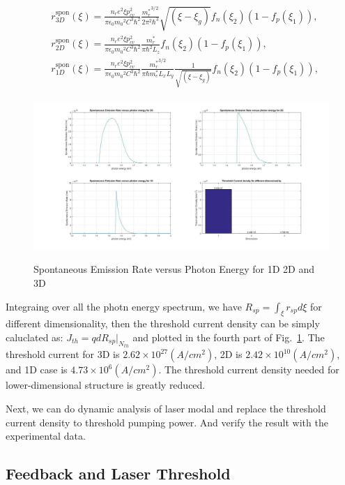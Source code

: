 \begin{eqnarray}
\begin{aligned}
& r_{3D}^{\mathrm{spon}}(\xi)=\frac{n_re^2\xi{p_{cv}^2}}{{\pi}\epsilon_0{m_0}^2C^3{\hbar^2}}\frac{{m_r^\ast}^{3/2}}{2\pi^2\hbar^3}{\sqrt{(\xi-\xi_g)}}f_n(\xi_2)(1-f_p(\xi_1)),
\\
& r_{2D}^{\mathrm{spon}}(\xi)=\frac{n_re^2\xi{p_{cv}^2}}{{\pi}\epsilon_0{m_0}^2C^3{\hbar^2}}\frac{{m_r^\ast}}{\pi\hbar^2L_z}f_n(\xi_2)(1-f_p(\xi_1)),
\\
& r_{1D}^{\mathrm{spon}}(\xi)=\frac{n_re^2\xi{p_{cv}^2}}{{\pi}\epsilon_0{m_0}^2C^3{\hbar^2}}\frac{{m_r^\ast}^{3/2}}{\pi\hbar{m_e^\ast}L_xL_y}\frac{1}{\sqrt{(\xi-\xi_g)}}f_n(\xi_2)(1-f_p(\xi_1)),
\end{aligned}
\label{eq:six}
\end{eqnarray}

\begin{figure}
  \caption{Spontaneous Emission Rate versus Photon Energy for 1D 2D and 3D}
  \centering
  \includegraphics[width=\textwidth]{pictures/LT/sponrate}
  \label{sponrate}
\end{figure}

Integraing over all the photn energy spectrum, we have $R_{sp} =
\int_{\xi}r_{sp}d{\xi}$ for different dimensionality, then the threshold
current density can be simply caluclated as: $J_{th}= qdR_{sp}|_{N_{th}}$ and
plotted in the fourth part of Fig.~\ref{sponrate}. The threshold current for 3D
is $2.62\times10^{27} (A/cm^2)$, 2D is $2.42\times10^{10} (A/cm^2)$, and 1D
case is $4.73\times10^{6} (A/cm^2)$. The threshold current density needed for
lower-dimensional structure is greatly reduced.

Next, we can do dynamic analysis of laser modal and replace the threshold
current density to threshold pumping power. And verify the result with the
experimental data.

\subsection{Feedback and Laser Threshold}
